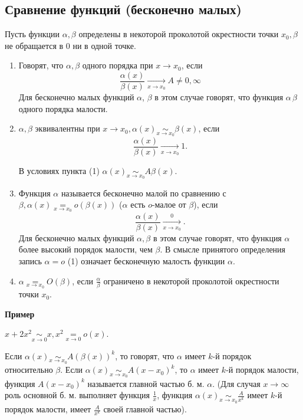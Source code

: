 \subsection{Сравнение функций (бесконечно малых)}
\begin{Definition}
Пусть функции $\alpha, \beta$ определены в некоторой проколотой окрестности точки $x_0, \beta$ не обращается в $0$ ни в одной точке.
\begin{enumerate}
\item Говорят, что $\alpha, \beta$ одного порядка при $x \rightarrow x_0$, если
$$\frac{\alpha(x)}{\beta(x)} \xrightarrow[x \rightarrow x_0]{} A \neq 0, \infty$$
Для бесконечно малых функций $\alpha$, $\beta$ в этом случае говорят, что функция $\alpha\, \beta$ одного порядка малости.
\item $\alpha, \beta$ эквивалентны при $x \rightarrow x_0, \alpha(x) \underset{x \rightarrow x_0}{\sim} \beta(x)$, если
$$\frac{\alpha(x)}{\beta(x)} \xrightarrow[x \rightarrow x_0]{} 1.$$
\begin{Remark} В условиях пункта (1) $\alpha(x) \underset{x \rightarrow x_0}{\sim} A\beta(x).$ \end{Remark}
\item Функция $\alpha$ называется бесконечно малой по сравнению с $\beta, \alpha(x)  \underset{x \rightarrow x_0}{=} o\left(\beta(x) \right)$ ($\alpha$ есть $o$-малое от $\beta$), если
$$\frac{\alpha(x)}{\beta(x)} \xrightarrow[x \rightarrow x_0] 0.$$
Для бесконечно малых функций $\alpha, \beta$ в этом случае говорят, что функция $\alpha$ более высокий порядок малости, чем $\beta$.
В смысле принятого определения запись $\alpha = o$ (1) означает бесконечную малость функции $\alpha$.
\item $\alpha \underset{x \rightarrow x_0}{=} O(\beta)$, если $\frac{\alpha}{\beta}$ ограничено в некоторой проколотой окрестности точки $x_0$.
\end{enumerate}
\par\medskip \textbf{Пример}\par $x + 2x^2 \underset{x \rightarrow 0}{\sim} x, x^2 \underset{x \rightarrow 0}{=} o(x)$.
\end{Definition}

\begin{Definition}
  Если $\alpha(x) \underset{x \rightarrow x_0}{\sim} A \left(\beta(x) \right)^k$, то говорят, что $\alpha$ имеет $k$-й порядок относительно $\beta$.
  Если $\alpha(x) \underset{x \rightarrow x_0}{\sim} A \left(x - x_0 \right)^k$, то $\alpha$ имеет $k$-й порядок малости, функция $A(x-x_0)^k$ называется главной частью б. м. $\alpha$.
  (Для случая $x \rightarrow \infty$ роль основной б. м. выполняет функция $\frac1{x}$, функция $\alpha(x) \underset{x \rightarrow x_0}{\sim} \frac{A}{x^k}$ имеет $k$-й порядок малости, имеет $\frac{A}{x^k}$ своей главной частью).
\end{Definition}

